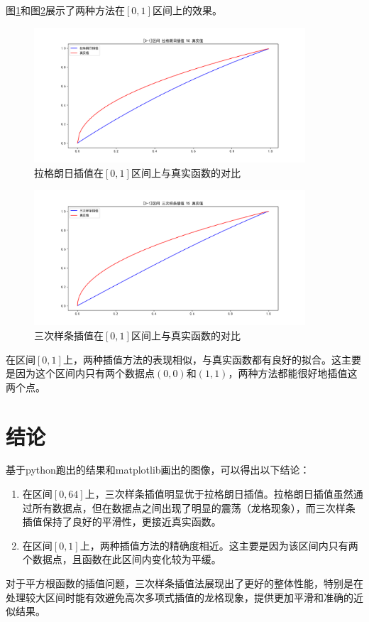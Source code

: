 \documentclass{article}
\begin{document}
图\ref{fig:lagrange_0_1}和图\ref{fig:spline_0_1}展示了两种方法在$[0,1]$区间上的效果。

\begin{figure}[H]
\centering
\includegraphics[width=0.9\textwidth]{./verify_results/lagrange/lagrange_interpolation_0_1.png}
\caption{拉格朗日插值在$[0,1]$区间上与真实函数的对比}
\label{fig:lagrange_0_1}
\end{figure}

\begin{figure}[H]
\centering
\includegraphics[width=0.9\textwidth]{./verify_results/CubicSpline/CubicSpline_0_1.png}
\caption{三次样条插值在$[0,1]$区间上与真实函数的对比}
\label{fig:spline_0_1}
\end{figure}

在区间$[0,1]$上，两种插值方法的表现相似，与真实函数都有良好的拟合。这主要是因为这个区间内只有两个数据点$(0,0)$和$(1,1)$，两种方法都能很好地插值这两个点。

\section{结论}

基于python跑出的结果和matplotlib画出的图像，可以得出以下结论：

\begin{enumerate}
    \item 在区间$[0,64]$上，三次样条插值明显优于拉格朗日插值。拉格朗日插值虽然通过所有数据点，但在数据点之间出现了明显的震荡（龙格现象），而三次样条插值保持了良好的平滑性，更接近真实函数。
    
    \item 在区间$[0,1]$上，两种插值方法的精确度相近。这主要是因为该区间内只有两个数据点，且函数在此区间内变化较为平缓。
\end{enumerate}

对于平方根函数的插值问题，三次样条插值法展现出了更好的整体性能，特别是在处理较大区间时能有效避免高次多项式插值的龙格现象，提供更加平滑和准确的近似结果。
\end{document}
